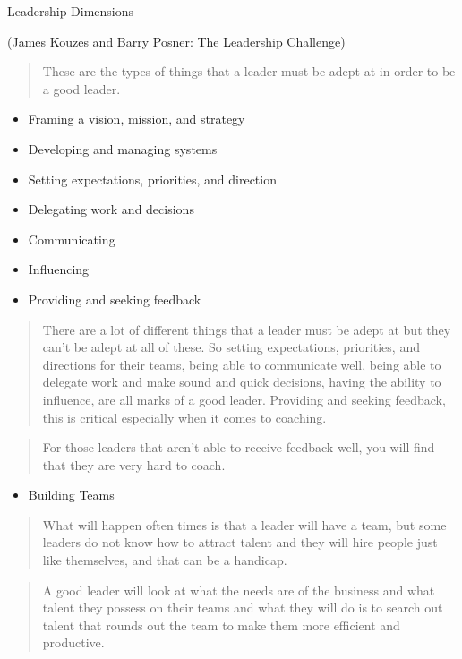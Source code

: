 \documentclass[]{book}
\begin{document}
Leadership Dimensions

(James Kouzes and Barry Posner: The Leadership Challenge)

\begin{quote}
These are the types of things that a leader must be adept at in order to be a good leader.
\end{quote}

\begin{itemize}
\item
  Framing a vision, mission, and strategy
\item
  Developing and managing systems
\item
  Setting expectations, priorities, and direction
\item
  Delegating work and decisions
\item
  Communicating
\item
  Influencing
\item
  Providing and seeking feedback
\end{itemize}

\begin{quote}
There are a lot of different things that a leader must be adept at but they can't be adept at all of these. So setting expectations, priorities, and directions for their teams, being able to communicate well, being able to delegate work and make sound and quick decisions, having the ability to influence, are all marks of a good leader. Providing and seeking feedback, this is critical especially when it comes to coaching.
\end{quote}

\begin{quote}
For those leaders that aren't able to receive feedback well, you will find that they are very hard to coach.
\end{quote}

\begin{itemize}
\item
  Building Teams
\end{itemize}

\begin{quote}
What will happen often times is that a leader will have a team, but some leaders do not know how to attract talent and they will hire people just like themselves, and that can be a handicap.
\end{quote}

\begin{quote}
A good leader will look at what the needs are of the business and what talent they possess on their teams and what they will do is to search out talent that rounds out the team to make them more efficient and productive.
\end{quote}
\end{document}

